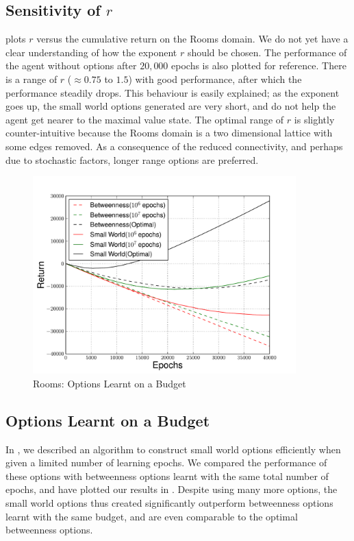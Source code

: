 \subsection{Sensitivity of $r$}
\label{sec:sw:experiments:sensitivity-r}
 plots $r$ versus the cumulative return on the
Rooms domain. We do not yet have a clear understanding of how the
exponent $r$ should be chosen. The performance of the agent without
options after $20,000$ epochs is also plotted for reference. There is
a range of $r$ ($\approx 0.75$ to $1.5$) with good performance, after
which the performance steadily drops. This behaviour is easily
explained; as the exponent goes up, the small world options generated
are very short, and do not help the agent get nearer to the maximal
value state. The optimal range of $r$ is slightly counter-intuitive
because the Rooms domain is a two dimensional lattice with some edges
removed. As a consequence of the reduced connectivity, and perhaps due
to stochastic factors, longer range options are preferred.

\begin{figure}[tbh]
  \centering
    \includegraphics[width=4in]{figures/rooms-learnt-200}
    \caption{Rooms: Options Learnt on a Budget}
    \label{fig:rooms-learnt}
\end{figure}

\subsection{Options Learnt on a Budget}
\label{sec:sw:experiments:budget}
In , we described an algorithm to construct small
world options efficiently when given a limited number of learning
epochs. We compared the performance of these options with betweenness
options learnt with the same total number of epochs, and have plotted
our results in . Despite using many more
options, the small world options thus created significantly outperform
betweenness options learnt with the same budget, and are even comparable
to the optimal betweenness options.


